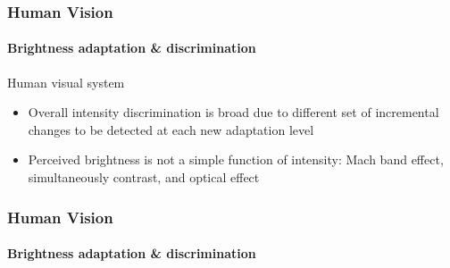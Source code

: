 \documentclass{beamer}
\begin{document}
\begin{frame}
  \frametitle{Human Vision}
  \framesubtitle{Brightness adaptation \& discrimination}
  \begin{block}{Human visual system}
    \begin{itemize}\scriptsize
    \item Overall intensity discrimination is broad due to different set of incremental changes to be detected at each new adaptation level
    \item Perceived brightness is not a simple function of intensity: Mach band effect, simultaneously contrast, and optical effect
    \end{itemize}
  \end{block}
\end{frame}

\begin{frame}
  \frametitle{Human Vision}
  \framesubtitle{Brightness adaptation \& discrimination}

\end{frame}
\end{document}
